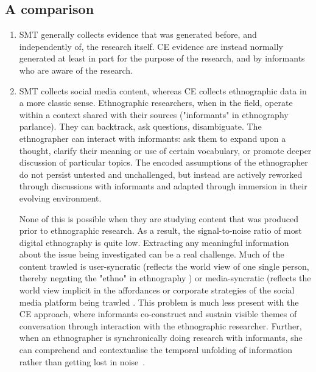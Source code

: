 \subsection{A comparison}

\begin{enumerate}
\item SMT generally collects evidence that was generated before, and independently of, the research itself. CE evidence are instead normally generated at least in part for the purpose of the research, and by informants who are aware of the research.

\item SMT collects social media content, whereas CE collects ethnographic data in a more classic sense. Ethnographic researchers, when in the field, operate within a context shared with their sources ("informants" in ethnography parlance). They can backtrack, ask questions, disambiguate. The ethnographer can interact with informants: ask them to expand upon a thought, clarify their meaning or use of certain vocabulary, or promote deeper discussion of particular topics. The encoded assumptions of the ethnographer do not persist untested and unchallenged, but instead are actively reworked through discussions with informants and adapted through immersion in their evolving environment.  

None of this is possible when they are studying content that was produced prior to ethnographic research. As a result, the signal-to-noise ratio of most digital ethnography is quite low. Extracting any meaningful information about the issue being investigated can be a real challenge. Much of the content trawled is user-syncratic (reflects the world view of one single person, thereby negating the "ethno" in ethnography \cite{Munk2016}) or media-syncratic (reflects the world view implicit in the affordances or corporate strategies of the social media platform being trawled \cite{Gershon2011,Bucher2017,Burrell2012,Munk2016}. This problem is much less present with the CE approach, where informants co-construct and sustain visible themes of conversation through interaction with the ethnographic researcher. Further, when an ethnographer is synchronically doing research with informants, she can comprehend and contextualise the temporal unfolding of information rather than getting lost in noise~\cite{Coleman2010}.


\end{enumerate}
